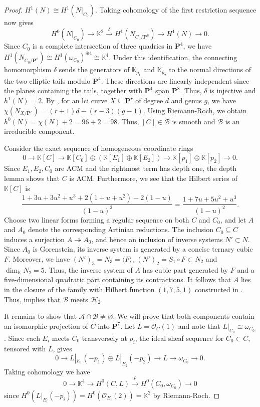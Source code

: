 \documentclass[leqno,11pt,a4paper]{amsart}
\theoremstyle{definition}
\numberwithin{equation}{section}
\newcommand{\kk}{\mathbb{K}}
\newcommand{\PP}{\mathbf{P}}
\newcommand{\OO}{\mathscr{O}}
\newcommand{\HH}{\mathcal{H}}
\begin{document}
\begin{proof}
$H^1(N)\cong H^1(N|_{C_0})$. Taking cohomology of the first restriction sequence now gives
$$
H^0(N|_{C_0})
\longrightarrow\kk^2
\xrightarrow{\delta}
H^1(N_{C_0/\PP^8})
\longrightarrow H^1(N)
\longrightarrow0.
$$
Since $C_0$ is a complete intersection of three quadrics in $\PP^4$, we have $H^1(N_{C_0/\PP^8})\cong H^1(\omega_{C_0})^{\oplus4}\cong\kk^4$.
Under this identification, the connecting homomorphism $\delta$ sends the generators of $\kk_{p_1}$ and $\kk_{p_2}$ to the normal directions of the two elliptic tails modulo $\PP^4$.
These directions are linearly independent since the planes containing the tails, together with $\PP^4$ span $\PP^8$. 
Thus, $\delta$ is injective and $h^1(N)=2$.
By \cite[Chapter XXI, Equation (5.17)]{Arbarello__Geometry_of_algebraic_curves}, for an lci curve $X \subseteq \PP^r$ of degree $d$ and genus $g$, we have $\chi(N_{X/\PP^r})= (r+1)d - (r-3)(g-1)$. 
Using Riemann-Roch, we obtain $h^0(N)=\chi(N)+2 = 96 +2 =98$. 
Thus, $[C] \in \mathcal{B}$ is smooth and $\mathcal{B}$ is an irreducible component.

Consider the exact sequence of homogeneous coordinate rings
$$
0 \to \kk[C] \to \kk[C_0] \oplus (\kk[E_1] \oplus \kk[E_2]) \to \kk[p_1] \oplus \kk[p_2] \to 0. 
$$ 
Since $E_1,E_2,C_0$ are ACM and the rightmost term has depth one, the depth lemma shows that $C$ is ACM. 
Furthermore, we see that the Hilbert series of $\kk[C]$ is
$$
\frac{1+3u+3u^2+u^3+2(1+u+u^2)-2(1-u)}{(1-u)^2}
=\frac{1+7u+5u^2+u^3}{(1-u)^2}.
$$
Choose two linear forms forming a regular sequence on both $C$ and $C_0$, and let $A$ and $A_0$ denote the corresponding Artinian reductions.
The inclusion $C_0\subseteq C$ induces a surjection $A\twoheadrightarrow A_0$, and hence an inclusion of inverse systems $N'\subset N$.
Since $A_0$ is Gorenstein, its inverse system is generated by a concise ternary cubic $F$. 
Moreover, we have $(N')_3=N_3=\langle F\rangle$, $(N')_2=S_1\circ F\subset N_2$ and $\dim_\kk N_2=5$.
Thus, the inverse system of $A$ has cubic part generated by $F$ and a five-dimensional quadratic part containing its contractions. 
It follows that $A$ lies in the closure of the family with Hilbert function $(1,7,5,1)$ constructed in .
Thus,  implies that $\mathcal{B}$ meets $\HH_2$.



It remains to show that $\mathcal A\cap\mathcal B\neq\varnothing$. 
We will prove that both components contain an isomorphic projection of $C$ into $\PP^7$. 
Let $L=\OO_C(1)$ and note that $L|_{C_0}\cong\omega_{C_0}$.
Since each $E_i$ meets $C_0$ transversely at $p_i$, the ideal sheaf sequence for $C_0\subset C$, tensored with $L$, gives
$$
0\longrightarrow L|_{E_1}(-p_1)\oplus L|_{E_2}(-p_2) \longrightarrow L \longrightarrow \omega_{C_0} \longrightarrow 0.
$$
Taking cohomology we have 
$$
0\longrightarrow \kk^4\longrightarrow H^0(C,L) \xrightarrow{\rho} H^0(C_0,\omega_{C_0})\longrightarrow 0
$$ 
since $H^0(L|_{E_i}(-p_i)) = H^0(\OO_{E_i}(2)) = \kk^2$ by Riemann-Roch.


\end{proof}
\end{document}

